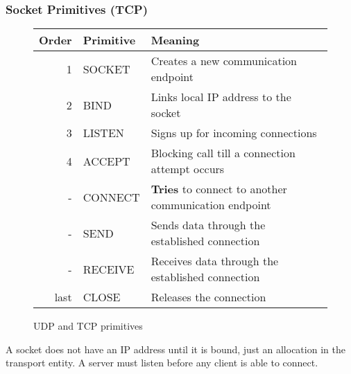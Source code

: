   \begin{frame}
    \frametitle{Socket Primitives (TCP)}
    \begin{figure}
      \centering
      \resizebox{10cm}{!} {
        \begin{tabular}{r|l|l}
          Order & Primitive & Meaning \\ \hline
          1     & SOCKET    & Creates a new communication endpoint \\ \hline
          2     & BIND      & Links local IP address to the socket \\ \hline
          3     & LISTEN    & Signs up for incoming connections \\ \hline
          4     & ACCEPT    & Blocking call till a connection attempt occurs \\ \hline
          -     & CONNECT   & \textbf{Tries} to connect to another communication endpoint \\ \hline
          -     & SEND      & Sends data through the established connection \\ \hline
          -     & RECEIVE   & Receives data through the established connection \\ \hline
          last  & CLOSE     & Releases the connection \\ \hline
        \end{tabular}
      }
      \caption{UDP and TCP primitives}
      \label{fig:primitives}
    \end{figure}
    A socket does not have an IP address until it is bound, just an allocation in the transport entity. A server must listen before any client is able to connect.
  \end{frame}

  \begin{frame}
    \frametitle{}
  \end{frame}